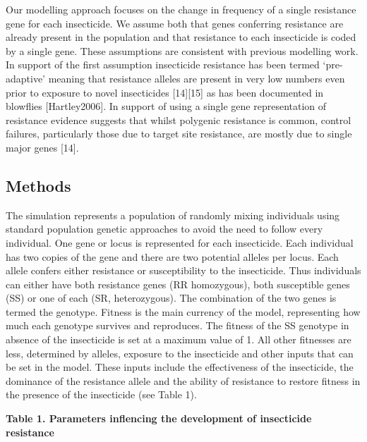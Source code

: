 \documentclass[11pt,]{article}
\begin{document}
Our modelling approach focuses on the change in frequency of a single
resistance gene for each insecticide. We assume both that genes
conferring resistance are already present in the population and that
resistance to each insecticide is coded by a single gene. These
assumptions are consistent with previous modelling work. In support of
the first assumption insecticide resistance has been termed
`pre-adaptive' meaning that resistance alleles are present in very low
numbers even prior to exposure to novel insecticides {[}14{]}{[}15{]} as
has been documented in blowflies {[}Hartley2006{]}. In support of using
a single gene representation of resistance evidence suggests that whilst
polygenic resistance is common, control failures, particularly those due
to target site resistance, are mostly due to single major genes
{[}14{]}.

\subsection{Methods}\label{methods}

The simulation represents a population of randomly mixing individuals
using standard population genetic approaches to avoid the need to follow
every individual. One gene or locus is represented for each insecticide.
Each individual has two copies of the gene and there are two potential
alleles per locus. Each allele confers either resistance or
susceptibility to the insecticide. Thus individuals can either have both
resistance genes (RR homozygous), both susceptible genes (SS) or one of
each (SR, heterozygous). The combination of the two genes is termed the
genotype. Fitness is the main currency of the model, representing how
much each genotype survives and reproduces. The fitness of the SS
genotype in absence of the insecticide is set at a maximum value of 1.
All other fitnesses are less, determined by alleles, exposure to the
insecticide and other inputs that can be set in the model. These inputs
include the effectiveness of the insecticide, the dominance of the
resistance allele and the ability of resistance to restore fitness in
the presence of the insecticide (see Table 1).

\textbf{Table 1. Parameters inflencing the development of insecticide
resistance}
\end{document}
